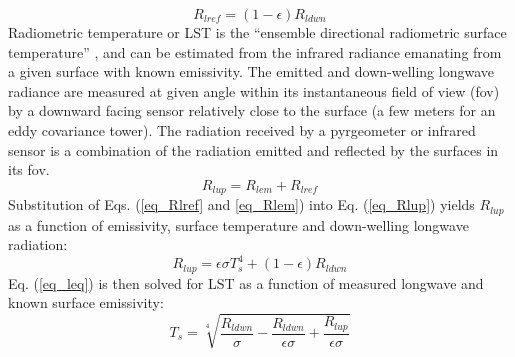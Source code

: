 \documentclass[fleqn,10pt]{wlscirep}
\begin{document}
\begin{equation}\label{eq_Rlref}
R_{lref} = (1 - \epsilon) R_{ldwn} 
\end{equation}
Radiometric temperature or LST is the “ensemble directional radiometric surface temperature” \cite{norman1995terminology}, and can be estimated from the infrared radiance emanating from a given surface with known emissivity\cite{kustas2007utility}. The emitted and down-welling longwave radiance are measured at given angle within its instantaneous field of view (fov) by a downward facing sensor relatively close to the surface (a few meters for an eddy covariance tower). The radiation received by a pyrgeometer or infrared sensor is a combination of the radiation emitted and reflected by the surfaces in its fov. 
\begin{equation}\label{eq_Rlup}
R_{lup} = R_{lem} + R_{lref}
\end{equation}
Substitution of Eqs. (\ref{eq_Rlref} and \ref{eq_Rlem}) into Eq. (\ref{eq_Rlup}) yields $R_{lup}$ as a function of emissivity, surface temperature and down-welling longwave radiation:
\begin{equation}\label{eq_leq}
R_{lup}= \epsilon \sigma T_{s}^{4} + (1- \epsilon)R_{ldwn}
\end{equation}
Eq. (\ref{eq_leq}) is then solved for LST as a function of measured longwave and known surface emissivity:
\begin{equation}\label{eq_Tleq}
T_{s} = \sqrt[4]{\frac{R_{ldwn}}{\sigma} - \frac{R_{ldwn}}{\epsilon \sigma} + \frac{R_{lup}}{\epsilon \sigma}}
\end{equation}
\end{document}
